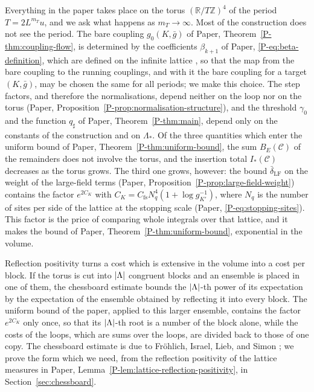 \documentclass[11pt]{preprint}
\DeclarePairedDelimiter{\abs}{\lvert}{\rvert}
\numberwithin{equation}{section}
\theoremstyle{definition}
\theoremstyle{remark}
\theoremstyle{plain}
\begin{document}
Everything in the paper takes place on the torus $(\mathbb R/T\mathbb Z)^4$ of the period $T = 2L^{m_T}u$, and we ask what happens as $m_T \to \infty$. Most of the construction does not see the period. The bare coupling $g_0(K, \bar g)$ of Paper, Theorem~\ref{P-thm:coupling-flow}, is determined by the coefficients $\beta_{k+1}$ of Paper, \eqref{P-eq:beta-definition}, which are defined on the infinite lattice \cite[(1.20)--(1.22), p.~264]{BalabanRG1}, so that the map from the bare coupling to the running couplings, and with it the bare coupling for a target $(K, \bar g)$, may be chosen the same for all periods; we make this choice. The step factors, and therefore the normalisations, depend neither on the loop nor on the torus (Paper, Proposition~\ref{P-prop:normalisation-structure}), and the threshold $\gamma_0$ and the function $q_\sharp$ of Paper, Theorem~\ref{P-thm:main}, depend only on the constants of the construction and on $\Lambda_*$. Of the three quantities which enter the uniform bound of Paper, Theorem~\ref{P-thm:uniform-bound}, the sum $B_E(\mathcal C)$ of the remainders does not involve the torus, and the insertion total $I_*(\mathcal C)$ decreases as the torus grows. The third one grows, however: the bound $\bar\delta_{\mathrm{LF}}$ on the weight of the large-field terms (Paper, Proposition~\ref{P-prop:large-field-weight}) contains the factor $e^{2C_K}$ with $C_K = C_{\mathrm{fs}}N_q^4(1 + \log g_{K'}^{-1})$, where $N_q$ is the number of sites per side of the lattice at the stopping scale (Paper, \eqref{P-eq:stopping-sites}). This factor is the price of comparing whole integrals over that lattice, and it makes the bound of Paper, Theorem~\ref{P-thm:uniform-bound}, exponential in the volume.

Reflection positivity turns a cost which is extensive in the volume into a cost per block. If the torus is cut into $\abs{\Lambda}$ congruent blocks and an ensemble is placed in one of them, the chessboard estimate bounds the $\abs{\Lambda}$-th power of its expectation by the expectation of the ensemble obtained by reflecting it into every block. The uniform bound of the paper, applied to this larger ensemble, contains the factor $e^{2C_K}$ only once, so that its $\abs{\Lambda}$-th root is a number of the block alone, while the costs of the loops, which are sums over the loops, are divided back to those of one copy. The chessboard estimate is due to Fr\"ohlich, Israel, Lieb, and Simon \cite{FILS}; we prove the form which we need, from the reflection positivity of the lattice measures in Paper, Lemma~\ref{P-lem:lattice-reflection-positivity}, in Section~\ref{sec:chessboard}.
\end{document}
